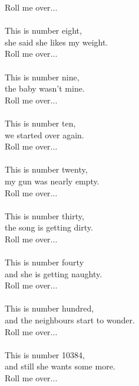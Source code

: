             Roll me over... \\
\hspace{10mm} \\
            This is number eight, \\
            she said she likes my weight. \\
            Roll me over... \\
\hspace{10mm} \\
            This is number nine, \\
            the baby wasn’t mine. \\
            Roll me over... \\
\hspace{10mm} \\
            This is number ten, \\
            we started over again. \\
            Roll me over... \\
\hspace{10mm} \\
            This is number twenty, \\
            my gun was nearly empty. \\
            Roll me over... \\
\hspace{10mm} \\
            This is number thirty, \\
            the song is getting dirty. \\
            Roll me over... \\
\hspace{10mm} \\
            This is number fourty \\
            and she is getting naughty. \\
            Roll me over... \\
\hspace{10mm} \\
            This is number hundred, \\
            and the neighbours start to wonder. \\
            Roll me over... \\
\hspace{10mm} \\
            This is number 10384, \\
            and still she wants some more. \\
            Roll me over... \\
